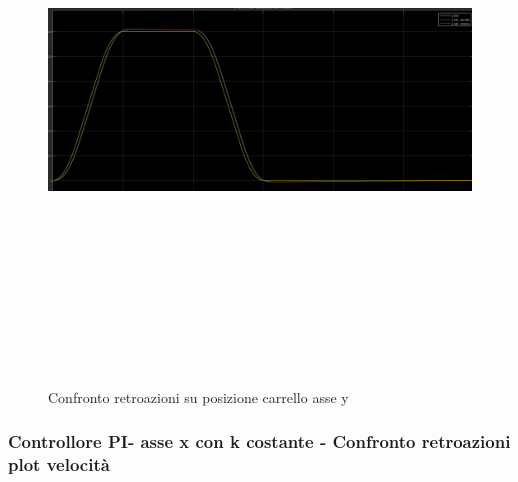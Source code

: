 \documentclass{article}
\begin{document}
\begin{figure}[H]
\centering
\includegraphics[width=13cm,height=15cm,keepaspectratio]{./simulink/ldm_rigido/PIDY1_POSIZIONE}
\caption{Confronto retroazioni su posizione carrello asse y}
\end{figure}

\subsubsection{Controllore PI- asse x con k costante - Confronto retroazioni plot velocità}
\end{document}
